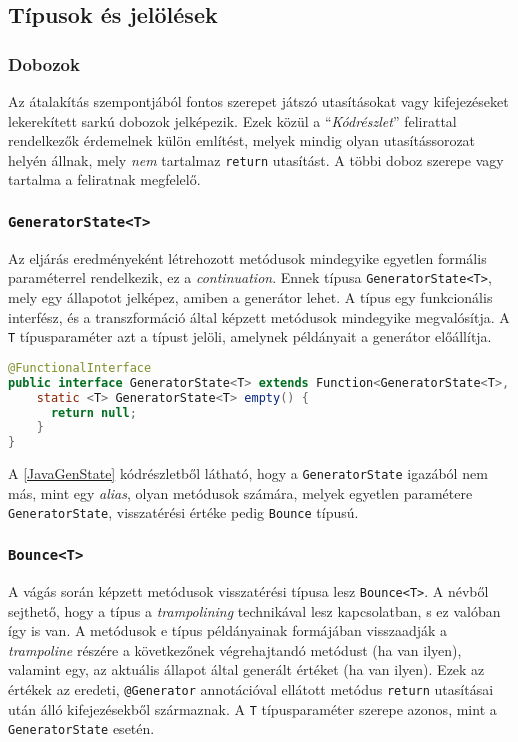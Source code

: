 \subsection{Típusok és jelölések}

\subsubsection{Dobozok}

Az átalakítás szempontjából fontos szerepet játszó utasításokat vagy kifejezéseket lekerekített sarkú dobozok jelképezik. Ezek közül a ``\textit{Kódrészlet}'' felirattal rendelkezők érdemelnek külön említést, melyek mindig olyan utasítássorozat helyén állnak, mely \textit{nem} tartalmaz \texttt{return} utasítást. A többi doboz szerepe vagy tartalma a feliratnak megfelelő.

\subsubsection{\texttt{GeneratorState<T>}}

Az eljárás eredményeként létrehozott metódusok mindegyike egyetlen formális paraméterrel rendelkezik, ez a \textit{continuation}. Ennek típusa \texttt{GeneratorState<T>}, mely egy állapotot jelképez, amiben a generátor lehet. A típus egy funkcionális interfész, és a transzformáció által képzett metódusok mindegyike megvalósítja. A \texttt{T} típusparaméter azt a típust jelöli, amelynek példányait a generátor előállítja.

\begin{lstlisting}[language=Java, caption={A \texttt{GeneratorState<T>} interfész}, captionpos=b, label=JavaGenState, escapechar=$]
@FunctionalInterface
public interface GeneratorState<T> extends Function<GeneratorState<T>, Bounce<T>> {
    static <T> GeneratorState<T> empty() { 
      return null; 
    }
}
\end{lstlisting}

A \ref{JavaGenState} kódrészletből látható, hogy a \texttt{GeneratorState} igazából nem más, mint egy \textit{alias}, olyan metódusok számára, melyek egyetlen paramétere \texttt{GeneratorState}, visszatérési értéke pedig \texttt{Bounce} típusú.

\subsubsection{\texttt{Bounce<T>}}

A vágás során képzett metódusok visszatérési típusa lesz \texttt{Bounce<T>}. A névből sejthető, hogy a típus a \textit{trampolining} technikával lesz kapcsolatban, s ez valóban így is van. A metódusok e típus példányainak formájában visszaadják a \textit{trampoline} részére a következőnek végrehajtandó metódust (ha van ilyen), valamint egy, az aktuális állapot által generált értéket (ha van ilyen). Ezek az értékek az eredeti, \texttt{@Generator} annotációval ellátott metódus \texttt{return} utasításai után álló kifejezésekből származnak. A \texttt{T} típusparaméter szerepe azonos, mint a \texttt{GeneratorState} esetén.

